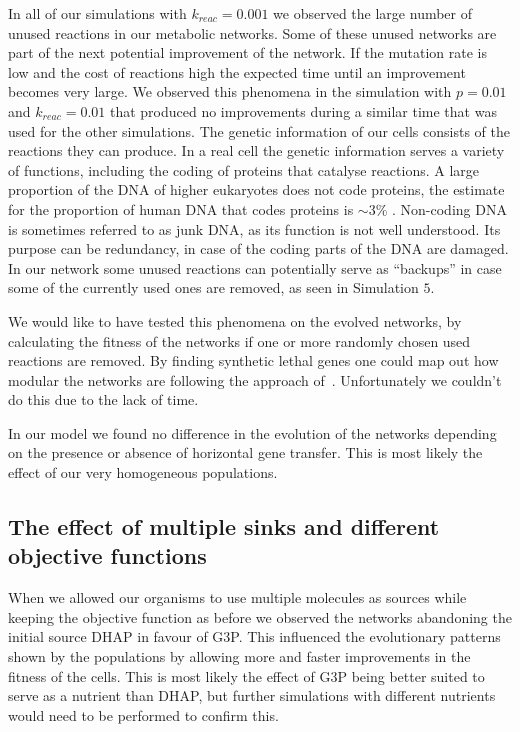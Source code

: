 \documentclass[a4paper,12pt]{article}
\begin{document}
In all of our simulations with $k_{reac}=0.001$ we observed the large number of unused reactions in our metabolic networks. Some of these unused networks are part of the next potential improvement of the network. If the mutation rate is low and the cost of reactions high the expected time until an improvement becomes very large. We observed this phenomena in the simulation with $p=0.01$ and $k_{reac}=0.01$ that produced no improvements during a similar time that was used for the other simulations. The genetic information of our cells consists of the reactions they can produce. In a real cell the genetic information serves a variety of functions, including the coding of proteins that catalyse reactions. A large proportion of the DNA of higher eukaryotes does not code proteins, the estimate for the proportion of human DNA that codes proteins is $\sim 3\%$ \cite{junkdna}. Non-coding DNA is sometimes referred to as junk DNA, as its function is not well understood. Its purpose can be redundancy, in case of the coding parts of the DNA are damaged. In our network some unused reactions can potentially serve as ``backups'' in case some of the currently used ones are removed, as seen in Simulation $5$. 

We would like to have tested this phenomena on the evolved networks, by calculating the fitness of the networks if one or more randomly chosen used reactions are removed. By finding synthetic lethal genes one could map out how modular the networks are following the approach of~\cite{evolutioncomplex}. Unfortunately we couldn't do this due to the lack of time.

In our model we found no difference in the evolution of the networks depending on the presence or absence of horizontal gene transfer. This is most likely the effect of our very homogeneous populations. 

\subsection{The effect of multiple sinks and different objective functions}
\label{sub:the_effect_of_multiple_sinks}

When we allowed our organisms to use multiple molecules as sources while keeping the objective function as before we observed the networks abandoning the initial source DHAP in favour of G3P. This influenced the evolutionary patterns shown by the populations by allowing more and faster improvements in the fitness of the cells. This is most likely the effect of G3P being better suited to serve as a nutrient than DHAP, but further simulations with different nutrients would need to be performed to confirm this.
\end{document}
